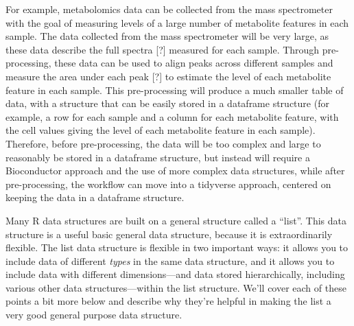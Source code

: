 \documentclass[]{tufte-book}
\begin{document}
For example, metabolomics data can be collected from the mass spectrometer with
the goal of measuring levels of a large number of metabolite features in each
sample. The data collected from the mass spectrometer will be very large, as
these data describe the full spectra {[}?{]} measured for each sample. Through
pre-processing, these data can be used to align peaks across different samples
and measure the area under each peak {[}?{]} to estimate the level of each
metabolite feature in each sample. This pre-processing will produce a much
smaller table of data, with a structure that can be easily stored in a dataframe
structure (for example, a row for each sample and a column for each metabolite
feature, with the cell values giving the level of each metabolite feature in
each sample). Therefore, before pre-processing, the data will be too complex and
large to reasonably be stored in a dataframe structure, but instead will require
a Bioconductor approach and the use of more complex data structures, while after
pre-processing, the workflow can move into a tidyverse approach, centered on
keeping the data in a dataframe structure.

Many R data structures are built on a general structure called a ``list''. This
data structure is a useful basic general data structure, because it is
extraordinarily flexible. The list data structure is flexible in two
important ways: it allows you to include data of different \emph{types} in the
same data structure, and it allows you to include data with different
dimensions---and data stored hierarchically, including various other data
structures---within the list structure. We'll cover each of these points a bit
more below and describe why they're helpful in making the list a very good
general purpose data structure.
\end{document}

